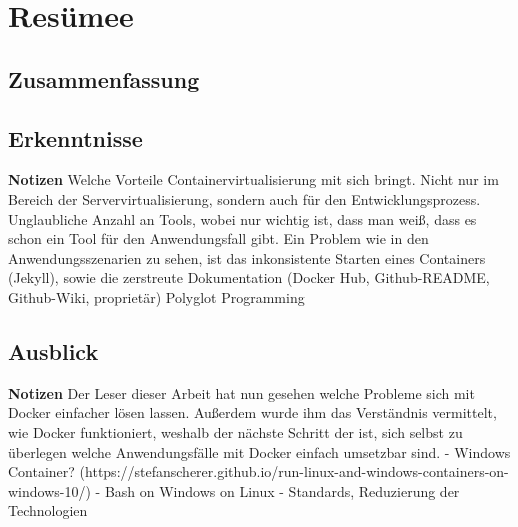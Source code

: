 
\chapter{Resümee}
\section{Zusammenfassung}

\section{Erkenntnisse}
\textbf{Notizen}
Welche Vorteile Containervirtualisierung mit sich bringt. Nicht nur im Bereich der Servervirtualisierung, sondern auch für den Entwicklungsprozess.
Unglaubliche Anzahl an Tools, wobei nur wichtig ist, dass man weiß, dass es schon ein Tool für den Anwendungsfall gibt.
Ein Problem wie in den Anwendungsszenarien zu sehen, ist das inkonsistente Starten eines Containers (Jekyll), sowie die zerstreute Dokumentation (Docker Hub, Github-README, Github-Wiki, proprietär)
Polyglot Programming

\section{Ausblick}
\textbf{Notizen}
Der Leser dieser Arbeit hat nun gesehen welche Probleme sich mit Docker einfacher lösen lassen. Außerdem wurde ihm das Verständnis vermittelt, wie Docker funktioniert, weshalb der nächste Schritt der ist, sich selbst zu überlegen welche Anwendungsfälle mit Docker einfach umsetzbar sind.
- Windows Container? (https://stefanscherer.github.io/run-linux-and-windows-containers-on-windows-10/)
- Bash on Windows on Linux
- Standards, Reduzierung der Technologien
